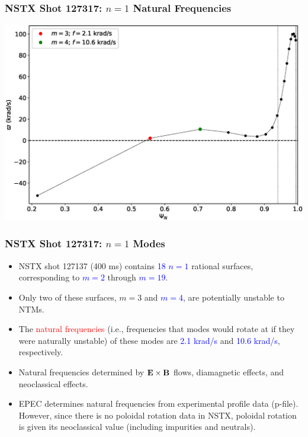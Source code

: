 \documentclass{beamer}
\newcommand{\blue}[1]{\textcolor{blue}{#1}}
\newcommand{\red}[1]{\textcolor{red}{#1}}
\begin{document}
\begin{frame}
\frametitle{NSTX Shot 127317: $n=1$ Natural Frequencies}

\begin{center}
\includegraphics[width=\textwidth]{Frequency.eps}
\end{center}
\end{frame}

\begin{frame}
\frametitle{NSTX Shot 127317: $n=1$ Modes}
\begin{itemize}
\item NSTX shot 127137 (400 ms) contains \blue{18 $n=1$} rational surfaces, corresponding to \blue{$m=2$} through
\blue{$m=19$}. 
\item Only two of these surfaces, {$m=3$} and \blue{$m=4$}, are potentially unstable to NTMs.  
\item The \red{natural frequencies} (i.e., frequencies that modes would rotate at if they were naturally unstable) of
these modes are \blue{2.1 krad/s} and \blue{10.6 krad/s}, respectively. 
\item Natural frequencies determined by \blue{${\bf E}\times {\bf B}$} flows, diamagnetic effects, and neoclassical
effects. 
\item EPEC determines natural frequencies from experimental profile data (p-file). However, since there is no
poloidal rotation data in NSTX, poloidal rotation is given its neoclassical value (including impurities and neutrals). 
\end{itemize}
\end{frame}
\end{document}
